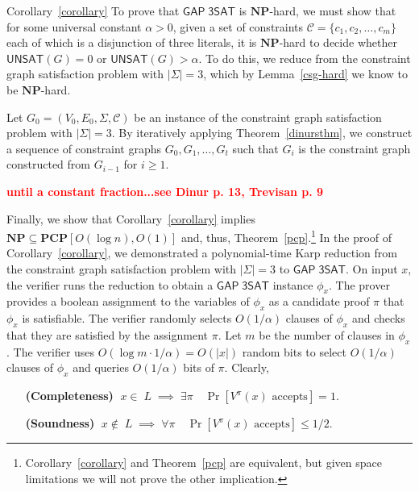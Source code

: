 \documentclass{article}
\newcommand{\fixme}[1] { \textcolor{red} {
{\fbox{ {\bf Fix:} \ensuremath{\blacktriangleright }} {\bf #1}
\fbox{\ensuremath{\blacktriangleleft} } } } }
\newenvironment{proof_of}[1]{\noindent {\bf Proof of #1:}
	\hspace*{1mm}}{\hspace*{\fill} $\Box$ }
\newcommand{\bits}{\{0,1\}}
\newcommand{\class}[1]{\mathbf{#1}}
\newcommand{\NP}{\class{NP}}
\newcommand{\PCP}{\class{PCP}}
\newcommand{\UNSAT}{\mathsf{UNSAT}}
\newcommand{\GAPSAT}{\mathsf{GAP\;3SAT}}
\begin{document}
\begin{proof_of}{Corollary~\ref{corollary}}
To prove that $\GAPSAT$ is $\NP$-hard, we must show that for some universal
constant $\alpha > 0$, given a set of constraints $\mathcal{C} = \{c_1, c_2, \dots, c_m\}$
each of which is a disjunction of three literals, it is $\NP$-hard to decide
whether $\UNSAT(G)=0$ or $\UNSAT(G)>\alpha$.
To do this, we reduce from the constraint graph satisfaction problem with
$|\Sigma| = 3$, which by Lemma~\ref{csg-hard} we know to be $\NP$-hard.

Let $G_0 = (V_0, E_0, \Sigma, \mathcal{C})$ be an instance of the constraint
graph satisfaction problem with $|\Sigma| = 3$.
By iteratively applying Theorem~\ref{dinursthm}, we construct a sequence
of constraint graphs $G_0, G_1, \dots, G_t$ such that $G_i$ is the constraint
graph constructed from $G_{i-1}$ for $i\ge 1$.

\fixme{until a constant fraction...see Dinur p. 13, Trevisan p. 9}
\end{proof_of}

Finally, we show that Corollary~\ref{corollary} implies $\NP \subseteq \PCP[O(\log n),O(1)]$
and, thus, Theorem~\ref{pcp}.\footnote{
Corollary~\ref{corollary} and Theorem~\ref{pcp} are equivalent, but given space limitations
we will not prove the other implication.}
In the proof of Corollary~\ref{corollary}, we demonstrated a polynomial-time
Karp reduction from the constraint graph satisfaction problem with
$|\Sigma| = 3$ to $\GAPSAT$.
On input $x$, the verifier runs the reduction  to obtain a $\GAPSAT$
instance $\phi_x$.
The prover provides %
a boolean assignment to the variables of $\phi_x$ as a candidate proof $\pi$
that $\phi_x$ is satisfiable.
The verifier randomly selects $O(1/\alpha)$ clauses of $\phi_x$ and
checks that they are satisfied by the assignment $\pi$.
Let $m$ be the number of clauses in $\phi_x$.
The verifier uses $O(\log m \cdot 1/\alpha) = O(|x|)$ random bits
to select $O(1/\alpha)$ clauses of $\phi_x$ and queries
$O(1/\alpha)$ bits of $\pi$.
Clearly,
\begin{itemize}[leftmargin=10em]
\item[\textbf{(Completeness)}] $\;x \in\; L \;\implies\; \exists \pi \quad \Pr[V^\pi(x) \text{ accepts}] = 1$.
\item[\textbf{(Soundness)}] $\;x \notin\; L \;\implies\; \forall \pi \quad \Pr[V^\pi(x) \text{ accepts}] \le 1/2$.
\end{itemize}
\end{document}
